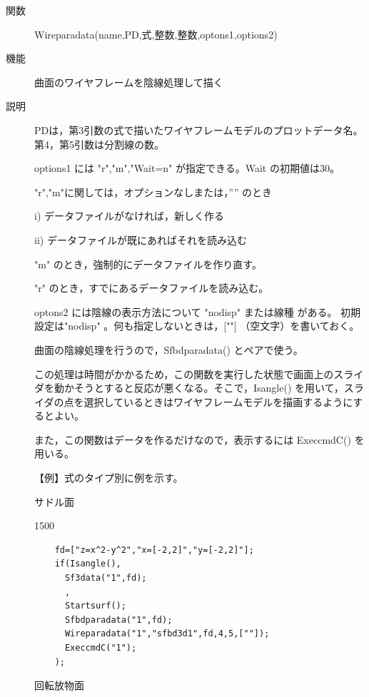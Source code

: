 \documentclass[papersize,a4paper,12pt,uplatex]{jsarticle}
\begin{document}
\begin{description}
\hypertarget{wireparadata}{}
\item[関数]  Wireparadata(name,PD,式,整数,整数,optons1,options2)
\item[機能]  曲面のワイヤフレームを陰線処理して描く
\item[説明]  PDは，第3引数の式で描いたワイヤフレームモデルのプロットデータ名。第4，第5引数は分割線の数。

options1 には "r","m","Wait=n" が指定できる。Wait の初期値は30。

  "r","m"に関しては，オプションなしまたは，”” のとき
  
    i) データファイルがなければ，新しく作る
    
    ii) データファイルが既にあればそれを読み込む
    
  "m"  のとき，強制的にデータファイルを作り直す。
  
  "r" のとき，すでにあるデータファイルを読み込む。
  
optons2 には陰線の表示方法について "nodisp" または線種 がある。 初期設定は"nodisp" 。何も指定しないときは，[""] （空文字）を書いておく。

曲面の陰線処理を行うので，Sfbdparadata() とペアで使う。

この処理は時間がかかるため，この関数を実行した状態で画面上のスライダを動かそうとすると反応が悪くなる。そこで，Isangle() を用いて，スライダの点を選択しているときはワイヤフレームモデルを描画するようにするとよい。

また，この関数はデータを作るだけなので，表示するには ExeccmdC() を用いる。

\vspace{\baselineskip} 
【例】式のタイプ別に例を示す。

\vspace{\baselineskip}
サドル面

\begin{layer}{150}{0}
\end{layer}
\begin{verbatim}
    fd=["z=x^2-y^2","x=[-2,2]","y=[-2,2]"];
    if(Isangle(),
      Sf3data("1",fd);
      ,
      Startsurf();
      Sfbdparadata("1",fd);
      Wireparadata("1","sfbd3d1",fd,4,5,[""]);
      ExeccmdC("1");
    );
\end{verbatim}

回転放物面


\end{description}
\end{document}
